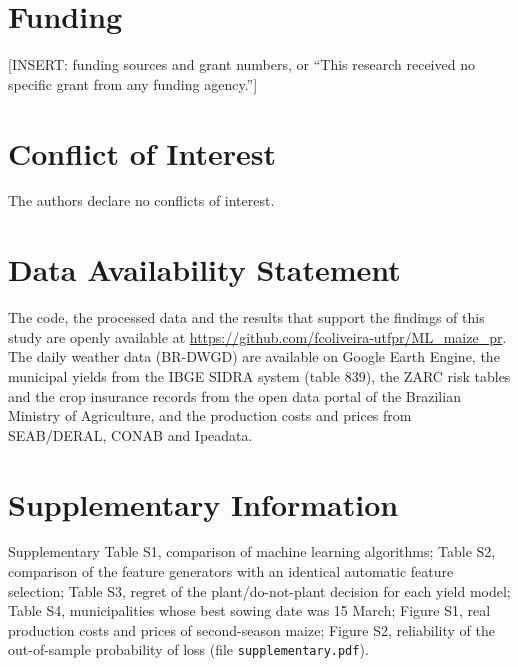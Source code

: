 \documentclass[10pt,a4paper]{article}
\begin{document}
\section*{Funding}

[INSERT: funding sources and grant numbers, or ``This research received no specific grant from any
funding agency.'']


\section*{Conflict of Interest}

The authors declare no conflicts of interest.


\section*{Data Availability Statement}

The code, the processed data and the results that support the findings of this study are openly
available at \url{https://github.com/fcoliveira-utfpr/ML_maize_pr}. The daily weather data (BR-DWGD) are
available on Google Earth Engine, the municipal yields from the IBGE SIDRA system (table 839), the ZARC
risk tables and the crop insurance records from the open data portal of the Brazilian Ministry of
Agriculture, and the production costs and prices from SEAB/DERAL, CONAB and Ipeadata.


\section*{Supplementary Information}

Supplementary Table S1, comparison of machine learning algorithms; Table S2, comparison of the feature
generators with an identical automatic feature selection; Table S3, regret of the plant/do-not-plant
decision for each yield model; Table S4, municipalities whose best sowing date was 15 March;
Figure S1, real production costs and prices of second-season maize; Figure S2, reliability of the
out-of-sample probability of loss (file \texttt{supplementary.pdf}).
\end{document}
